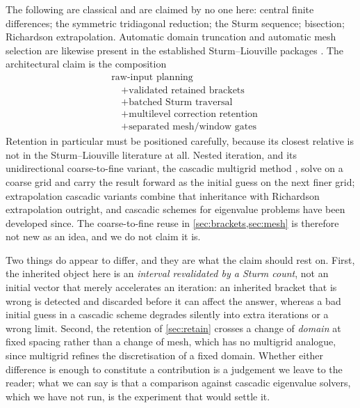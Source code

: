 \documentclass[twocolumn,10pt,a4paper]{article}
\theoremstyle{plain}
\theoremstyle{definition}
\begin{document}
The following are classical and are claimed by no one here: central finite
differences; the symmetric tridiagonal reduction; the Sturm sequence; bisection;
Richardson extrapolation. Automatic domain truncation and automatic mesh
selection are likewise present in the established Sturm--Liouville packages
\citep{bailey2001,pruess1993,ledoux2005,pryce1993}. The architectural claim is
the composition
\begin{equation}
\boxed{
\begin{aligned}
&\text{raw-input planning}\\
&\quad + \text{validated retained brackets}\\
&\quad + \text{batched Sturm traversal}\\
&\quad + \text{multilevel correction retention}\\
&\quad + \text{separated mesh/window gates}
\end{aligned}}
\end{equation}
Retention in particular must be positioned carefully, because its closest
relative is not in the Sturm--Liouville literature at all. Nested iteration, and
its unidirectional coarse-to-fine variant, the cascadic multigrid method
\citep{bornemann1996,trottenberg2001}, solve on a coarse grid and carry the
result forward as the initial guess on the next finer grid; extrapolation
cascadic variants combine that inheritance with Richardson extrapolation
outright, and cascadic schemes for eigenvalue problems have been developed
since. The coarse-to-fine reuse in \cref{sec:brackets,sec:mesh} is therefore not
new as an idea, and we do not claim it is.

Two things do appear to differ, and they are what the claim should rest on.
First, the inherited object here is an \emph{interval revalidated by a Sturm
count}, not an initial vector that merely accelerates an iteration: an inherited
bracket that is wrong is detected and discarded before it can affect the answer,
whereas a bad initial guess in a cascadic scheme degrades silently into extra
iterations or a wrong limit. Second, the retention of \cref{sec:retain} crosses
a change of \emph{domain} at fixed spacing rather than a change of mesh, which
has no multigrid analogue, since multigrid refines the discretisation of a fixed
domain. Whether either difference is enough to constitute a contribution is a
judgement we leave to the reader; what we can say is that a comparison against
cascadic eigenvalue solvers, which we have not run, is the experiment that
would settle it.
\end{document}
